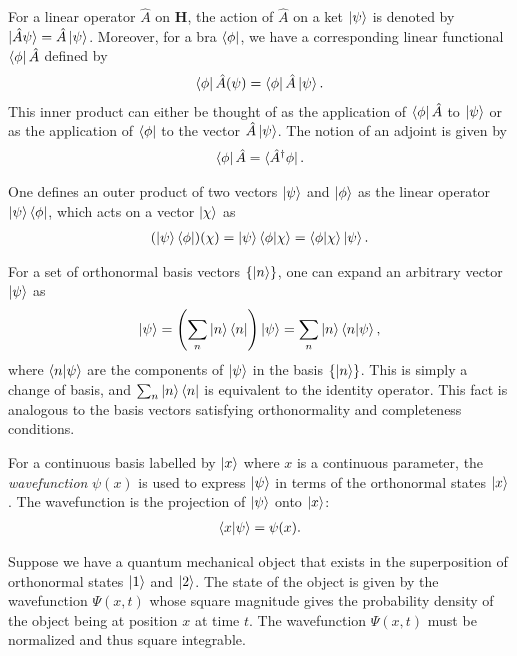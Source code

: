 For a linear operator $\hat{A}$ on $\mathbf{H}$, the action of $\hat{A}$ on a ket $\ket{\psi}$ is denoted by $\ket{\hat{A}\psi} = \hat{A}\ket{\psi}$. Moreover, for a bra $\bra{\phi}$, we have a corresponding linear functional $\bra{\phi}\hat{A}$ defined by
\begin{align}
    \bra{\phi}\hat{A}(\psi) = \bra{\phi}\hat{A}\ket{\psi}.
\end{align}
This inner product can either be thought of as the application of $\bra{\phi}\hat{A}$ to $\ket{\psi}$ or as the application of $\bra{\phi}$ to the vector $\hat{A}\ket{\psi}$. The notion of an adjoint is given by
\begin{align}
    \bra{\phi}\hat{A} = \bra{\hat{A}^\dagger\phi}.
\end{align}

One defines an outer product of two vectors $\ket{\psi}$ and $\ket{\phi}$ as the linear operator $\ket{\psi}\bra{\phi}$, which acts on a vector $\ket{\chi}$ as
\begin{align}
    (\ket{\psi}\bra{\phi})(\chi) = \ket{\psi}\braket{\phi|\chi} = \braket{\phi|\chi}\ket{\psi}.
\end{align}

For a set of orthonormal basis vectors $\{\ket{n}\}$, one can expand an arbitrary vector $\ket{\psi}$ as
\begin{align}
    \ket{\psi} = \left( \sum_n \ket{n}\bra{n} \right)\ket{\psi} = \sum_n \ket{n}\braket{n|\psi},
\end{align}
where $\braket{n|\psi}$ are the components of $\ket{\psi}$ in the basis $\{\ket{n}\}$. This is simply a change of basis, and $\sum_n \ket{n}\bra{n}$ is equivalent to the identity operator. This fact is analogous to the basis vectors satisfying orthonormality and completeness conditions.

For a continuous basis labelled by $\ket{x}$ where $x$ is a continuous parameter, the \textit{wavefunction} $\psi(x)$ is used to express $\ket{\psi}$ in terms of the orthonormal states $\ket{x}$. The wavefunction is the projection of $\ket{\psi}$ onto $\ket{x}$:
\begin{align}
    \braket{x|\psi} = \psi(x).
\end{align}

Suppose we have a quantum mechanical object that exists in the superposition of orthonormal states $\ket{1}$ and $\ket{2}$. The state of the object is given by the wavefunction $\Psi(x,t)$ whose square magnitude gives the probability density of the object being at position $x$ at time $t$. The wavefunction $\Psi(x,t)$ must be normalized and thus square integrable.


